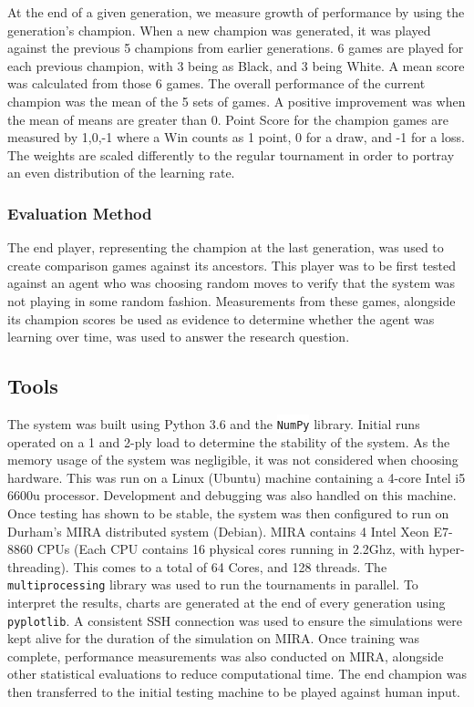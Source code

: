 \documentclass[12pt,a4paper]{article}
\newcommand{\inlinecode}[2]{\colorbox{white}{\fontsize{10}{10}\lstinline[language=#1]$#2$}}
\begin{document}
        At the end of a given generation, we measure growth of performance by using the generation's champion. When a new champion was generated, it was played against the previous 5 champions from earlier generations. 6 games are played for each previous champion, with 3 being as Black, and 3 being White. A mean score was calculated from those 6 games. The overall performance of the current champion was the mean of the 5 sets of games. A positive improvement was when the mean of means are greater than 0. Point Score for the champion games are measured by {1,0,-1} where a Win counts as 1 point, 0 for a draw, and -1 for a loss. The weights are scaled differently to the regular tournament in order to portray an even distribution of the learning rate.
    
        \subsubsection*{Evaluation Method}
    
        The end player, representing the champion at the last generation, was used to create comparison games against its ancestors. This player was to be first tested against an agent who was choosing random moves to verify that the system was not playing in some random fashion. Measurements from these games, alongside its champion scores be used as evidence to determine whether the agent was learning over time, was used to answer the research question.
       
    \subsection{Tools}
        The system was built using Python 3.6 and the \inlinecode{Python}{NumPy} library. Initial runs operated on a 1 and 2-ply load to determine the stability of the system. As the memory usage of the system was negligible, it was not considered when choosing hardware. This was run on a Linux (Ubuntu) machine containing a 4-core Intel i5 6600u processor. Development and debugging was also handled on this machine. Once testing has shown to be stable, the system was then configured to run on Durham's MIRA distributed system (Debian). MIRA contains 4 Intel Xeon E7-8860 CPUs (Each CPU contains 16 physical cores running in 2.2Ghz, with hyper-threading). This comes to a total of 64 Cores, and 128 threads. The \inlinecode{Python}{multiprocessing} library was used to run the tournaments in parallel. To interpret the results, charts are generated at the end of every generation using \inlinecode{Python}{pyplotlib}. A consistent SSH connection was used to ensure the simulations were kept alive for the duration of the simulation on MIRA. Once training was complete, performance measurements was also conducted on MIRA, alongside other statistical evaluations to reduce computational time. The end champion was then transferred to the initial testing machine to be played against human input.
\end{document}

